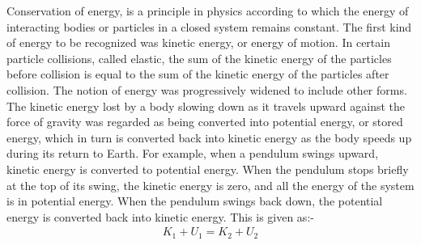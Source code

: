 \begin{phybox}{}
{Conservation of energy, is a principle in physics according to which the energy of interacting bodies or particles in a closed system remains constant. The first kind of energy to be recognized was kinetic energy, or energy of motion. In certain particle collisions, called elastic, the sum of the kinetic energy of the particles before collision is equal to the sum of the kinetic energy of the particles after collision. The notion of energy was progressively widened to include other forms. The kinetic energy lost by a body slowing down as it travels upward against the force of gravity was regarded as being converted into potential energy, or stored energy, which in turn is converted back into kinetic energy as the body speeds up during its return to Earth. For example, when a pendulum swings upward, kinetic energy is converted to potential energy. When the pendulum stops briefly at the top of its swing, the kinetic energy is zero, and all the energy of the system is in potential energy. When the pendulum swings back down, the potential energy is converted back into kinetic energy. This is given as:-
\begin{align*}
    K_1+U_1=K_2+U_2
\end{align*}}
\end{phybox}
